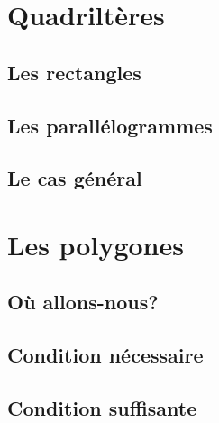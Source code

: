 \documentclass[12pt]{amsart}
\begin{document}


\section{Quadriltères}

\subsection{Les rectangles}



\subsection{Les parallélogrammes}



\subsection{Le cas général}





\section{Les polygones}

\subsection{Où allons-nous?}



\subsection{Condition nécessaire}   



\subsection{Condition suffisante}

\end{document}
